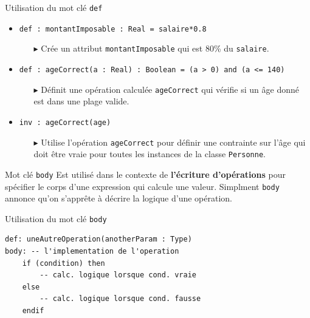 \documentclass[16pt]{report}
\begin{document}
\begin{multicols*}{2}
        \begin{EExample}{Utilisation du mot clé \texttt{def}  }{}
            \begin{itemize}
                \item \texttt{\textcolor{myb}{def :} montantImposable \textcolor{myb}{: Real = salaire*0.8}}  
                \begin{itemize}
                    \item[$\blacktriangleright$] Crée un attribut \texttt{montantImposable} qui est 80\% 
                    du \texttt{salaire}.     
                \end{itemize}
            \item \texttt{\textcolor{myb}{def :} ageCorrect(a : Real) : Boolean = (a > 0) and (a <= 140) }  
            \begin{itemize}
                \item[$\blacktriangleright$] Définit une opération calculée \texttt{ageCorrect} qui vérifie 
                    si un âge donné est dans une plage valide. 
            \end{itemize}
                
            \item \texttt{\textcolor{myb}{inv : ageCorrect(age)}}  
            \begin{itemize}
                \item[$\blacktriangleright$] Utilise l'opération \texttt{ageCorrect} pour définir une contrainte 
                    sur l'âge qui doit être vraie pour toutes les instances de la classe \texttt{Personne}. 
            \end{itemize}
        \end{itemize}
    \end{EExample}                      
    
        



    \begin{Definitionx}{Mot clé \texttt{body}}{}
            Est utilisé dans le contexte de \textbf{l'écriture d'opérations} pour spécifier le corps d'une expression 
            qui calcule une valeur. Simplment \texttt{body} annonce qu'on s'apprête à décrire la logique 
            d'une opération. 
    \end{Definitionx}

    \begin{EExample}{Utilisation du mot clé \texttt{body}}{}
        \begin{lstlisting} 
def: uneAutreOperation(anotherParam : Type) 
body: -- l'implementation de l'operation
    if (condition) then
        -- calc. logique lorsque cond. vraie
    else
        -- calc. logique lorsque cond. fausse
    endif
\end{lstlisting}
    \end{EExample}          



\end{multicols*}
\end{document}

